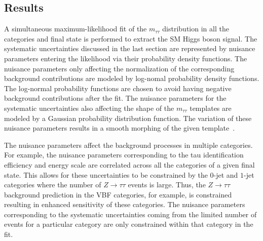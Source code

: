 \subsection{Results}

A simultaneous maximum-likelihood fit of the $m_{\tau\tau}$ distribution in all the categories and final state is performed to extract the SM Higgs boson signal. The systematic uncertainties discussed in the last section are represented by nuisance parameters entering the likelihood via their probability density functions. The nuisance parameters only affecting the normalization of the corresponding background contributions are modeled by log-nomal  probability density functions. The log-normal probability functions are chosen to avoid having negative background contributions after the fit. The nuisance parameters for the systematic uncertainties also affecting the shape of the $m_{\tau\tau}$ templates are modeled by a Gaussian probability distribution function. The variation of these nuisance parameters results in a smooth morphing of the given template~\cite{Conway-PhyStat}. 

The nuisance parameters affect the background processes in multiple categories. For example, the nuisance parameters corresponding to the tau identification efficiency and energy scale  are correlated across all the categories of a given final state. This allows for these uncertainties to be constrained by the $0$-jet and $1$-jet categories where the number of $Z\rightarrow\tau\tau$ events is large. Thus, the $Z\rightarrow\tau\tau$ background prediction in the VBF categories, for example, is constrained resulting in enhanced sensitivity of these categories. The nuisance parameters corresponding to the systematic uncertainties coming from the limited number of events for a particular category are only constrained within that category in the fit. 

